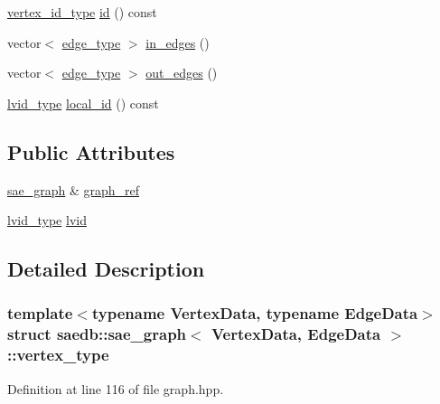 \begin{DoxyCompactItemize}
\item 
\hyperlink{classsaedb_1_1sae__graph_a2f9a7bf2db556689f1cd9de9562ff41f}{vertex\-\_\-id\-\_\-type} \hyperlink{structsaedb_1_1sae__graph_1_1vertex__type_ae6b591fd40d4f080ee1c07741327ba67}{id} () const 
\item 
vector$<$ \hyperlink{classsaedb_1_1sae__graph_1_1edge__type}{edge\-\_\-type} $>$ \hyperlink{structsaedb_1_1sae__graph_1_1vertex__type_a0a70b2799c2309519c79eb805476c1aa}{in\-\_\-edges} ()
\item 
vector$<$ \hyperlink{classsaedb_1_1sae__graph_1_1edge__type}{edge\-\_\-type} $>$ \hyperlink{structsaedb_1_1sae__graph_1_1vertex__type_aa81f6d3ddc7905990c767628e1eb838d}{out\-\_\-edges} ()
\item 
\hyperlink{classsaedb_1_1sae__graph_afcd2ad6444e374e40a7a5ee4c46be052}{lvid\-\_\-type} \hyperlink{structsaedb_1_1sae__graph_1_1vertex__type_ac295ff8f407594f3f1013acd41fbf48c}{local\-\_\-id} () const 
\end{DoxyCompactItemize}
\subsection*{Public Attributes}
\begin{DoxyCompactItemize}
\item 
\hyperlink{classsaedb_1_1sae__graph}{sae\-\_\-graph} \& \hyperlink{structsaedb_1_1sae__graph_1_1vertex__type_a5977862a541ff4fe90999fbf49d287dd}{graph\-\_\-ref}
\item 
\hyperlink{classsaedb_1_1sae__graph_afcd2ad6444e374e40a7a5ee4c46be052}{lvid\-\_\-type} \hyperlink{structsaedb_1_1sae__graph_1_1vertex__type_a580dbdb1a1037a94f7ee66d942d679cc}{lvid}
\end{DoxyCompactItemize}


\subsection{Detailed Description}
\subsubsection*{template$<$typename Vertex\-Data, typename Edge\-Data$>$struct saedb\-::sae\-\_\-graph$<$ Vertex\-Data, Edge\-Data $>$\-::vertex\-\_\-type}



Definition at line 116 of file graph.\-hpp.



